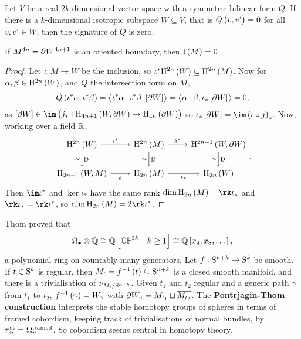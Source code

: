 \begin{exercise*}
Let $ V $ be a real $ 2k $-dimensional vector space with a symmetric bilinear form $ Q $. If there is a $ k $-dimensional isotropic subspace $ W \subseteq V $, that is $ Q\br{v, v'} = 0 $ for all $ v, v' \in W $, then the signature of $ Q $ is zero.
\end{exercise*}

\begin{corollary}
If $ M^{4n} = \da W^{4n + 1} $ is an oriented boundary, then $ \I\br{M} = 0 $.
\end{corollary}

\begin{proof}
Let $ \iota : M \to W $ be the inclusion, so $ \iota^*\H^{2n}\br{W} \subseteq \H^{2n}\br{M} $. Now for $ \alpha, \beta \in \H^{2n}\br{W} $, and $ Q $ the intersection form on $ M $,
$$ Q\br{\iota^*\alpha, \iota^*\beta} = \abr{\iota^*\alpha \cdot \iota^*\beta, \sbr{\da W}} = \abr{\alpha \cdot \beta, \iota_*\sbr{\da W}} = 0, $$
as $ \sbr{\da W} \in \im \br{j_* : \H_{4n + 1}\br{W, \da W} \to \H_{4n}\br{\da W}} $ so $ \iota_*\sbr{\da W} = \im \br{\iota \circ j}_* $. Now, working over a field $ \RR $,
$$
\begin{tikzcd}
\H^{2n}\br{W} \arrow{r}{\iota^*} \arrow{d}{\D}[swap]{\sim} & \H^{2n}\br{M} \arrow{r}{\delta^*} \arrow{d}{\D}[swap]{\sim} & \H^{2n + 1}\br{W, \da W} \arrow{d}{\D}[swap]{\sim} \\
\H_{2n + 1}\br{W, M} \arrow{r}[swap]{\delta} & \H_{2n}\br{M} \arrow{r}[swap]{\iota_*} & \H_{2n}\br{W}
\end{tikzcd}.
$$
Then $ \im \iota^* $ and $ \ker \iota_* $ have the same rank $ \dim \H_{2n}\br{M} - \rk \iota_* $ and $ \rk \iota_* = \rk \iota^* $, so $ \dim \H_{2n}\br{M} = 2\rk \iota^* $.
\end{proof}

Thom proved that
$$ \Omega_\bullet \otimes \QQ \cong \QQ\sbr{\CC\PP^{2k} \st k \ge 1} \cong \QQ\sbr{x_4, x_8, \dots}, $$
a polynomial ring on countably many generators. Let $ f : \S^{n + k} \to \S^k $ be smooth. If $ t \in \S^k $ is regular, then $ M_t = f^{-1}\br{t} \subseteq \S^{n + k} $ is a closed smooth manifold, and there is a trivialisation of $ \nu_{M_t / \S^{n + k}} $. Given $ t_1 $ and $ t_2 $ regular and a generic path $ \gamma $ from $ t_1 $ to $ t_2 $, $ f^{-1}\br{\gamma} = W_\gamma $ with $ \da W_\gamma = M_{t_1} \sqcup \overline{M_{t_2}} $. The \textbf{Pontrjagin-Thom construction} interprets the stable homotopy groups of spheres in terms of framed cobordism, keeping track of trivialisations of normal bundles, by $ \pi_n^{\s\t} = \Omega_n^{\text{framed}} $. So cobordism seems central in homotopy theory.

